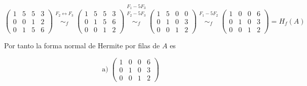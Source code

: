 \documentclass[a4paper,12pt]{article}
\begin{document}
\begin{ejercicio}[title=Ejercicio 10]
\[
\begin{pmatrix}
1 & 5 & 5 & 3\\
0 & 0 & 1 & 2\\
0 & 1 & 5 & 6
\end{pmatrix}
\overset{\substack{F_2 \leftrightarrow F_3 \\{}}}{\sim_f}
\begin{pmatrix}
1 & 5 & 5 & 3\\
0 & 1 & 5 & 6\\
0 & 0 & 1 & 2
\end{pmatrix}
\overset{\substack{F_1 - 5F_3 \\ F_2 - 5F_3 \\{}}}{\sim_f}
\begin{pmatrix}
1 & 5 & 0 & 0\\
0 & 1 & 0 & 3\\
0 & 0 & 1 & 2
\end{pmatrix}
\overset{\substack{F_1 - 5F_2 \\{}}}{\sim_f}
\begin{pmatrix}
1 & 0 & 0 & 6\\
0 & 1 & 0 & 3\\
0 & 0 & 1 & 2
\end{pmatrix}
= H_f(A)
\]

Por tanto la forma normal de Hermite por filas de \(A\) es

\[
\boxed{\text{a)}\;
\begin{pmatrix}
1 & 0 & 0 & 6\\
0 & 1 & 0 & 3\\
0 & 0 & 1 & 2
\end{pmatrix}
\;}
\]
\end{ejercicio}
\end{document}
